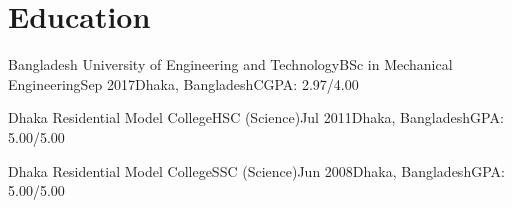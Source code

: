 \section{Education}

\resumeSubHeadingListStart

\resumeEdSubheading
{Bangladesh University of Engineering and Technology}{BSc in Mechanical Engineering}{Sep 2017}{Dhaka, Bangladesh}{CGPA: 2.97/4.00}

\resumeEdSubheading
{Dhaka Residential Model College}{HSC (Science)}{Jul 2011}{Dhaka, Bangladesh}{GPA: 5.00/5.00}

\resumeEdSubheading
{Dhaka Residential Model College}{SSC (Science)}{Jun 2008}{Dhaka, Bangladesh}{GPA: 5.00/5.00}

\resumeSubHeadingListEnd